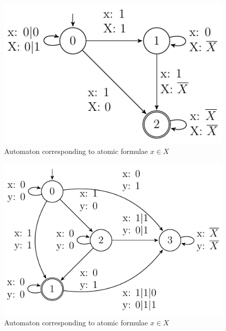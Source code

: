 \begin{figure}[h!]
 \begin{center}
  \includegraphics{fig/atomic-x-in-X}
 \end{center}
 \caption{Automaton corresponding to atomic formulae $x \in X$}
\end{figure}

\begin{figure}[h!]
 \begin{center}
  \includegraphics{fig/atomic-x-lesseq-y}
 \end{center}
 \caption{Automaton corresponding to atomic formulae $x \in X$}
\end{figure}



